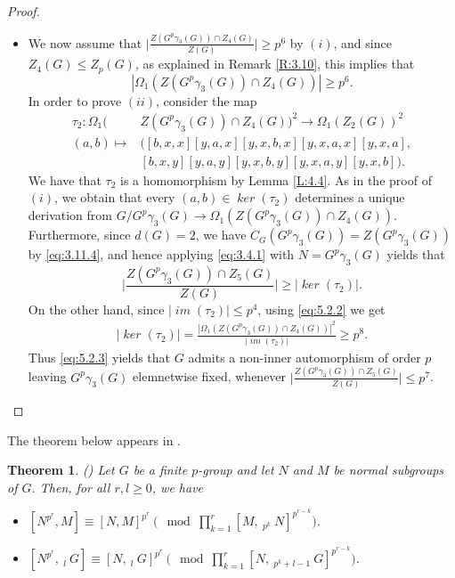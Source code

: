 \documentclass[preprint,sort&compress,12pt]{elsarticle}
\newtheorem{theorem}{Theorem}[section]
\theoremstyle{definition}
\numberwithin{equation}{theorem}
\DeclareMathOperator{\Ker}{\mathit{ker}}
\DeclareMathOperator{\im}{\mathit{im}}
\begin{document}
\begin{proof}
\begin{itemize}
\item [$(ii)$] We now assume that $\bigg|\frac{Z(G^p\gamma_3(G))\cap Z_4(G)}{Z(G)}\bigg|\ge p^6$ by $(i)$, and since $Z_4(G)\le Z_p(G)$, as explained in Remark \ref{R:3.10}, this implies that
\begin{equation}\label{eq:5.2.2}
|\Omega_1(Z(G^p\gamma_3(G))\cap Z_4(G))|\ge p^6.
\end{equation}
In order to prove $(ii)$, consider the map 
\begin{align*}
\tau_2: \Omega_1(&Z(G^p\gamma_3(G))\cap Z_4(G))^2\rightarrow \Omega_1(Z_2(G))^2\\
(a, b)\mapsto &\big([b, x, x][y, a, x] [y, x, b, x] [y, x, a, x] [y, x, a],\\
& [b, x, y][y, a, y] [y, x, b, y] [y, x, a, y] [y, x, b]\big).
\end{align*}
\noindent We have that $\tau_2$ is a homomorphism by Lemma \ref{L:4.4}. As in the proof of $(i)$, we obtain that every $(a, b)\in \Ker(\tau_2)$ determines a unique derivation from $G/G^p\gamma_3(G)\rightarrow \Omega_1(Z(G^p\gamma_3(G))\cap Z_4(G))$. Furthermore, since $d(G)=2$, we have $C_G(G^p\gamma_3(G))= Z(G^p\gamma_3(G))$ by \eqref{eq:3.11.4}, and hence applying \eqref{eq:3.4.1} with $N=G^p\gamma_3(G)$ yields that
\begin{equation}\label{eq:5.2.3}
\bigg|\frac{Z(G^p\gamma_3(G))\cap Z_5(G)}{Z(G)}\bigg|\ge |\Ker(\tau_2)|.
\end{equation}
\noindent On the other hand, since $|\im(\tau_2)|\le p^4$, using \eqref{eq:5.2.2} we get
\begin{align*}
|\Ker(\tau_2)|= \frac{|\Omega_1(Z(G^p\gamma_3(G))\cap Z_4(G))|^2}{|\im(\tau_2)|}\ge p^8.
\end{align*}
Thus \eqref{eq:5.2.3} yields that $G$ admits a non-inner automorphism of order $p$ leaving $G^p\gamma_3(G)$ elemnetwise fixed, whenever $\big|\frac{Z(G^p\gamma_3(G))\cap Z_5(G)}{Z(G)}\big|\le p^7$.
\end{itemize}
\end{proof}

The theorem below appears in \cite{ASZ}.
\begin{theorem}\label{th:5.3}(\cite[Theorem 2.4 and Theorem 2.5]{ASZ})
Let $G$ be a finite $p$-group and let $N$ and $M$ be normal subgroups of $G$. Then, for all $r, l\ge 0$, we have
\begin{itemize}
\item [$(i)$] $[N^{p^r}, M] \equiv [N, M]^{p^r}\ \bigg(\mod \prod_{k=1}^r [M,\ _{p^k}\ N]^{p^{r-k}}\bigg)$. 
\item [$(ii)$] $[N^{p^r},\ _l\ G] \equiv [N,\ _l\ G]^{p^r}\ \bigg(\mod \prod_{k=1}^r [N,\ _{p^k+l-1}\ G]^{p^{r-k}}\bigg)$.
\end{itemize}
\end{theorem}
\end{document}
